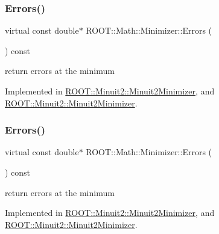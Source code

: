 \subsubsection{\texorpdfstring{Errors()}{Errors()}\hspace{0.1cm}{\footnotesize\ttfamily [1/2]}}
{\footnotesize\ttfamily virtual const double$\ast$ R\+O\+O\+T\+::\+Math\+::\+Minimizer\+::\+Errors (\begin{DoxyParamCaption}{ }\end{DoxyParamCaption}) const\hspace{0.3cm}{\ttfamily [pure virtual]}}



return errors at the minimum 



Implemented in \mbox{\hyperlink{classROOT_1_1Minuit2_1_1Minuit2Minimizer_a69c6dd9654ce41856814b358570cb9d7}{R\+O\+O\+T\+::\+Minuit2\+::\+Minuit2\+Minimizer}}, and \mbox{\hyperlink{classROOT_1_1Minuit2_1_1Minuit2Minimizer_a69c6dd9654ce41856814b358570cb9d7}{R\+O\+O\+T\+::\+Minuit2\+::\+Minuit2\+Minimizer}}.

\mbox{\label{classROOT_1_1Math_1_1Minimizer_a42f71e22f16cf4c59b621cf7e1e75f3d}} 
\subsubsection{\texorpdfstring{Errors()}{Errors()}\hspace{0.1cm}{\footnotesize\ttfamily [2/2]}}
{\footnotesize\ttfamily virtual const double$\ast$ R\+O\+O\+T\+::\+Math\+::\+Minimizer\+::\+Errors (\begin{DoxyParamCaption}{ }\end{DoxyParamCaption}) const\hspace{0.3cm}{\ttfamily [pure virtual]}}



return errors at the minimum 



Implemented in \mbox{\hyperlink{classROOT_1_1Minuit2_1_1Minuit2Minimizer_a69c6dd9654ce41856814b358570cb9d7}{R\+O\+O\+T\+::\+Minuit2\+::\+Minuit2\+Minimizer}}, and \mbox{\hyperlink{classROOT_1_1Minuit2_1_1Minuit2Minimizer_a69c6dd9654ce41856814b358570cb9d7}{R\+O\+O\+T\+::\+Minuit2\+::\+Minuit2\+Minimizer}}.

